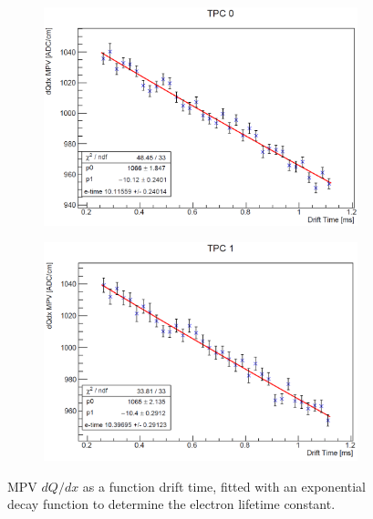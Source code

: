 \begin{figure}[htbp!]
        \centering
        \begin{subfigure}[b]{0.495\textwidth}
            \centering
            \includegraphics[width=\textwidth]{etime_tpc0}
        \end{subfigure}
        \hfill
        \begin{subfigure}[b]{0.495\textwidth}  
            \centering 
            \includegraphics[width=\textwidth]{etime_tpc1}
        \end{subfigure}
        \caption[etime_tpc]{MPV $dQ/dx$ as a function drift time, fitted with an exponential decay function to determine the electron lifetime constant.}
        \label{fig:etime_tpc}
\end{figure}

